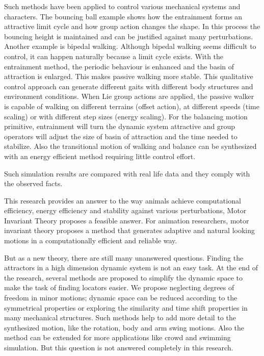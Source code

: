 Such methods have been applied to control various mechanical systems and characters. 
The bouncing ball example shows how the entrainment forms an attractive limit cycle and how group action changes the shape. 
In this process the bouncing height is maintained and can be justified against many perturbations. 
Another example is bipedal walking.  
Although bipedal walking seems difficult to control,  it can happen naturally because a limit cycle exists.
With the entrainment method, the periodic behaviour is enhanced and the basin of attraction is enlarged.  
This makes passive walking more stable. 
This qualitative control approach can generate different gaits with different body structures and environment conditions. 
When Lie group actions are applied, the passive walker is capable of walking on different terrains (offset action), at different speeds (time scaling) or with different step sizes (energy scaling). 
For the balancing motion primitive, entrainment will turn the dynamic system attractive and group operators will adjust the size of basin of attraction and the time needed to stabilize. 
Also the transitional motion of walking and balance can be synthesized with an energy efficient method requiring little control effort. 

Such simulation results are compared with real life data and they comply with the observed facts. 

This research provides an answer to the way animals achieve computational efficiency, energy efficiency and stability against various perturbations, Motor Invariant Theory proposes a feasible answer.
 For animation researchers, motor invariant theory proposes a method that generates adaptive and natural looking motions in a computationally efficient and reliable way.

But as a new theory, there are still many unanswered questions. 
Finding the attractors in a high dimension dynamic system is not an easy task. 
At the end of the research, several methods are proposed to simplify the dynamic space to make the task of finding locators easier. 
We propose neglecting degrees of freedom in minor motions; dynamic space can be reduced according to the symmetrical properties or exploring the similarity and time shift properties in many mechanical structures. 
Such methods help to add more detail to the synthesized motion, like the rotation, body and arm swing motions. 
Also the method can be extended for more applications like crowd and swimming simulation. 
But this question is not answered completely in this research.

